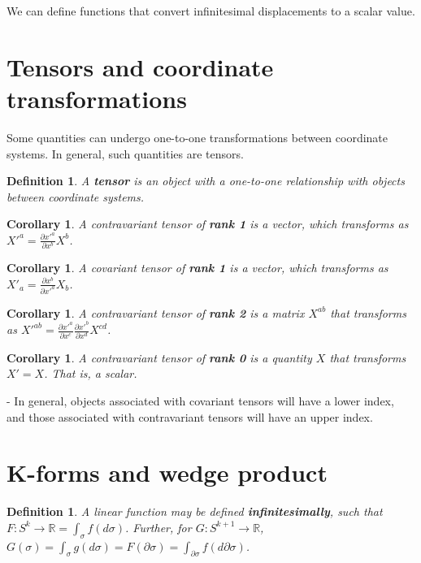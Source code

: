 \documentclass{book}
\newtheorem{defn}[equation]{Definition}
\newtheorem{coro}[equation]{Corollary}
\begin{document}
We can define functions that convert infinitesimal displacements to a scalar value. 




\section{Tensors and coordinate transformations}
Some quantities can undergo one-to-one transformations between coordinate systems. In general, such quantities are tensors. 


\begin{defn}
	A \textbf{tensor} is an object with a one-to-one relationship with objects between coordinate systems. 
\end{defn}

\begin{coro}
	A contravariant tensor of \textbf{rank 1} is a vector, which transforms as  $X'^a = \frac{\partial x'^a}{\partial x^b} X^b$.  
\end{coro}

\begin{coro}
	A covariant tensor of \textbf{rank 1} is a vector, which transforms as $X'_a = \frac{\partial x^b}{\partial x'^a} X_b$. 
\end{coro}

\begin{coro}
	A contravariant tensor of \textbf{rank 2} is a matrix $X^{ab}$ that transforms as $X'^{ab} = \frac{\partial x'^a}{\partial x^c} \frac{\partial x'^b}{\partial x^d} X^{cd}$. 
\end{coro}

\begin{coro}
	A contravariant tensor of \textbf{rank 0} is a quantity $X$ that transforms $X' = X$. That is, a scalar. 
\end{coro}

- In general, objects associated with covariant tensors will have a lower index, and those associated with contravariant tensors will have an upper index. 

\section{K-forms and wedge product}




\begin{defn}
	A linear function may be defined \textbf{infinitesimally}, such that $F : S^k \to \mathbb{R} = \int_{\sigma} f(d\sigma)$. Further, for $G : S^{k+1} \to \mathbb{R}$, $G(\sigma) = \int_{\sigma} g(d\sigma) = F(\partial\sigma) = \int_{\partial\sigma}f(d\partial\sigma)$. 
\end{defn}
\end{document}
